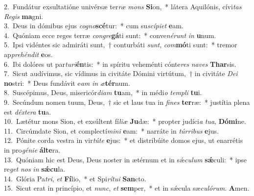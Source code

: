 {2.~}Fundátur exsultatióne univérsæ ter\textit{ræ} \textit{mons} \textbf{Si}on,~* látera Aquilónis, cívi\textit{tas} \textit{Re}\textit{gis} \textbf{ma}gni.\\
{3.~}Deus in dómibus ejus \textit{co}\textit{gno}\textbf{scé}tur:~* cum su\textit{scí}\textit{pi}\textit{et} \textbf{e}am.\\
{4.~}Quóniam ecce reges terræ \textit{con}\textit{gre}\textbf{gá}ti sunt:~* conve\textit{né}\textit{runt} \textit{in} \textbf{u}num.\\
{5.~}Ipsi vidéntes sic admiráti sunt,~† conturbáti \textit{sunt}, \textit{com}\textbf{mó}ti sunt:~* tremor ap\textit{pre}\textit{hén}\textit{dit} \textbf{e}os.\\
{6.~}Ibi dolóres ut par\textit{tu}\textit{ri}\textbf{én}tis:~* in spíritu veheménti cónte\textit{res} \textit{na}\textit{ves} \textbf{Thar}sis.\\
{7.~}Sicut audívimus, sic vídimus in civitáte Dómini virtútum,~† in civitáte \textit{De}\textit{i} \textbf{no}stri:~* Deus fundávit e\textit{am} \textit{in} \textit{æ}\textbf{tér}num.\\
{8.~}Suscépimus, Deus, misericór\textit{di}\textit{am} \textbf{tu}am,~* in médi\textit{o} \textit{tem}\textit{pli} \textbf{tu}i.\\
{9.~}Secúndum nomen tuum, Deus,~† sic et laus tua in \textit{fi}\textit{nes} \textbf{ter}ræ:~* justítia plena est \textit{déx}\textit{te}\textit{ra} \textbf{tu}a.\\
{10.~}Lætétur mons Sion, et exsúltent fí\textit{li}\textit{æ} \textbf{Ju}dæ:~* propter judíci\textit{a} \textit{tu}\textit{a}, \textbf{Dó}\textbf{mi}ne.\\
{11.~}Circúmdate Sion, et complectí\textit{mi}\textit{ni} \textbf{e}am:~* narráte in \textit{túr}\textit{ri}\textit{bus} \textbf{e}jus.\\
{12.~}Pónite corda vestra in vir\textit{tú}\textit{te} \textbf{e}jus:~* et distribúite domos ejus, ut enarrétis in pro\textit{gé}\textit{ni}\textit{e} \textbf{ál}\textbf{te}ra.\\
{13.~}Quóniam hic est Deus, Deus noster in ætérnum et in sǽ\textit{cu}\textit{lum} \textbf{sǽ}culi:~* ipse re\textit{get} \textit{nos} \textit{in} \textbf{sǽ}\textbf{cu}la.\\
{14.~}Glória Pa\textit{tri}, \textit{et} \textbf{Fí}lio,~* et Spi\textit{rí}\textit{tu}\textit{i} \textbf{San}cto.\\
{15.~}Sicut erat in princípio, et \textit{nunc}, \textit{et} \textbf{sem}per,~* et in sǽcula sæ\textit{cu}\textit{ló}\textit{rum}. \textbf{A}men.\\
